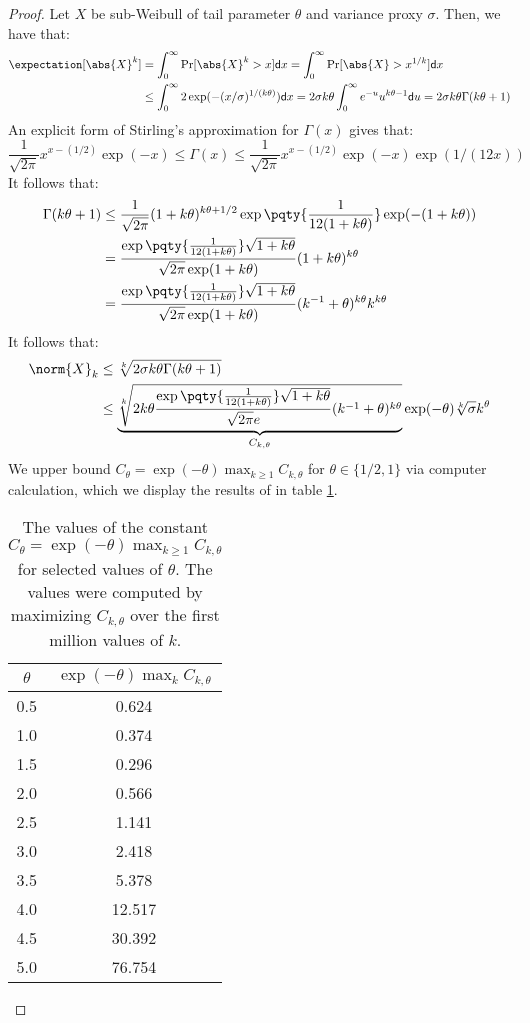 \begin{proof}
Let $X$ be sub-Weibull of tail parameter $\theta$ and variance proxy $\sigma$.
Then, we have that:
\begin{align*}
\expectation[\abs{X}^k] &= \int_0^\infty \Pr[\abs{X}^k > x]\mathsf{d}x = \int_0^\infty \Pr[\abs{X}>x^{1/k}]\mathsf{d}x\\
&\leq \int_0^\infty 2\exp(-(x/\sigma)^{1/(k\theta)})\mathsf{d}x = 2\sigma k\theta\int_0^\infty e^{-u}u^{k\theta-1}\mathsf{d}u=2\sigma k\theta\Gamma(k\theta+1)
\end{align*}
An explicit form of Stirling's approximation for $\Gamma(x)$ \cite{simple-gamma} gives that:
\begin{equation*}
\frac{1}{\sqrt{2\pi}}x^{x-(1/2)}\exp(-x)\leq\Gamma(x) \leq \frac{1}{\sqrt{2\pi}}x^{x-(1/2)}\exp(-x)\exp(1 / (12x))
\end{equation*}
It follows that:
\begin{align*}
\Gamma(k\theta + 1) &\leq \frac{1}{\sqrt{2\pi}}(1+k\theta)^{k\theta + 1/2}\exp\pqty{\frac{1}{12(1+k\theta)}}\exp(-(1+k\theta))\\
&= \frac{\exp\pqty{\frac{1}{12(1+k\theta)}}\sqrt{1+k\theta}}{\sqrt{2\pi}\exp(1+k\theta)}(1+k\theta)^{k\theta}\\
&=\frac{\exp\pqty{\frac{1}{12(1+k\theta)}}\sqrt{1+k\theta}}{\sqrt{2\pi}\exp(1 + k\theta)}(k^{-1}+\theta)^{k\theta}k^{k\theta}
\end{align*}
It follows that:
\begin{align*}
\norm{X}_k & \leq \sqrt[k]{2\sigma k\theta\Gamma(k\theta+1)}\\
&\leq \underbrace{\sqrt[k]{2k\theta \frac{\exp\pqty{\frac{1}{12(1+k\theta)}}\sqrt{1+k\theta}}{\sqrt{2\pi}e}(k^{-1}+\theta)^{k\theta}}}_{C_{k,\theta}}\exp(-\theta)\sqrt[k]{\sigma}k^\theta
\end{align*}
We upper bound $C_\theta = \exp(-\theta)\max_{k\geq 1} C_{k, \theta}$ for $\theta\in\{1/2, 1\}$ via computer calculation, which we display the results of in table \ref{tab: consts}.
\begin{table}[h]\label{tab: consts}
	\begin{center}
	\begin{tabular}{|c|c|}\hline
		$\theta$ & $\exp(-\theta) \max_{k}C_{k,\theta}$\\\hline
		0.5 & 0.624\\
		1.0 & 0.374\\
		1.5 & 0.296\\
		2.0 & 0.566\\
		2.5 & 1.141\\
		3.0 & 2.418\\
		3.5 & 5.378\\
		4.0 & 12.517\\
		4.5 & 30.392\\
		5.0 & 76.754\\\hline
	\end{tabular}
\end{center}
\caption{The values of the constant $C_\theta = \exp(-\theta)\max_{k\geq 1}C_{k,\theta}$ for selected values of $\theta$.
	The values were computed by maximizing $C_{k,\theta}$ over the first million values of $k$.}
\end{table}


\end{proof}
